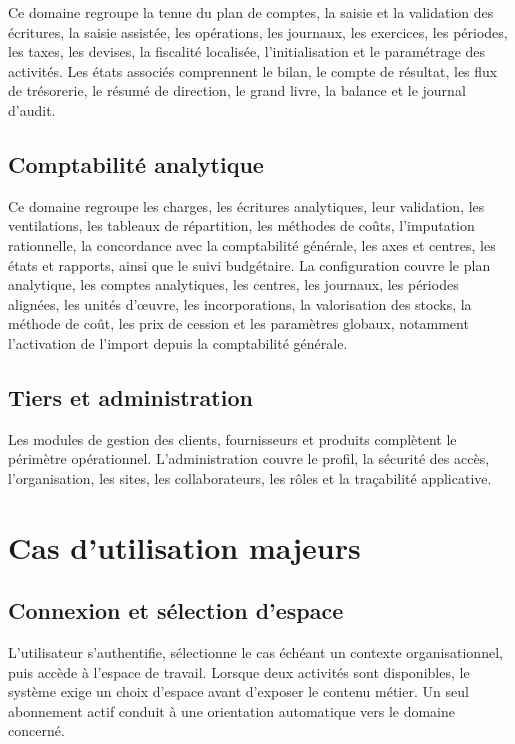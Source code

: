 \documentclass[12pt,a4paper]{report}
\begin{document}
Ce domaine regroupe la tenue du plan de comptes, la saisie et la validation des écritures, la saisie assistée, les opérations, les journaux, les exercices, les périodes, les taxes, les devises, la fiscalité localisée, l'initialisation et le paramétrage des activités. Les états associés comprennent le bilan, le compte de résultat, les flux de trésorerie, le résumé de direction, le grand livre, la balance et le journal d'audit.

\subsection{Comptabilité analytique}

Ce domaine regroupe les charges, les écritures analytiques, leur validation, les ventilations, les tableaux de répartition, les méthodes de coûts, l'imputation rationnelle, la concordance avec la comptabilité générale, les axes et centres, les états et rapports, ainsi que le suivi budgétaire. La configuration couvre le plan analytique, les comptes analytiques, les centres, les journaux, les périodes alignées, les unités d'œuvre, les incorporations, la valorisation des stocks, la méthode de coût, les prix de cession et les paramètres globaux, notamment l'activation de l'import depuis la comptabilité générale.

\subsection{Tiers et administration}

Les modules de gestion des clients, fournisseurs et produits complètent le périmètre opérationnel. L'administration couvre le profil, la sécurité des accès, l'organisation, les sites, les collaborateurs, les rôles et la traçabilité applicative.

\section{Cas d'utilisation majeurs}

\subsection{Connexion et sélection d'espace}

L'utilisateur s'authentifie, sélectionne le cas échéant un contexte organisationnel, puis accède à l'espace de travail. Lorsque deux activités sont disponibles, le système exige un choix d'espace avant d'exposer le contenu métier. Un seul abonnement actif conduit à une orientation automatique vers le domaine concerné.
\end{document}
